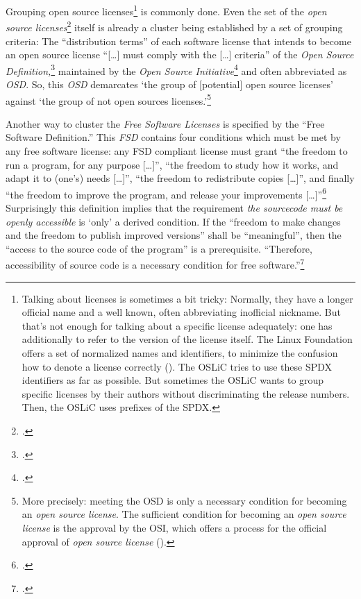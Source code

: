 Grouping open source licenses\footnote{Talking about licenses is sometimes a bit
tricky: Normally, they have a longer official name and a well known, often
abbreviating inofficial nickname. But that's not enough for talking about a
specific license adequately: one has additionally to refer to the version of the
license itself. The Linux Foundation offers a set of normalized names and
identifiers, to minimize the confusion how to denote a license correctly
(\cite[cf.][\nopage wp]{LinuxFounSpdxList2014a}). The OSLiC tries to use these
SPDX identifiers as far as possible. But sometimes the OSLiC wants to group
specific licenses by their authors without discriminating the release numbers.
Then, the OSLiC uses prefixes of the SPDX.} is commonly done.
Even the set of the \emph{open source li\-cen\-ses}\footcite[cf.][\nopage
wp]{OSI2012b} itself is already a cluster being established by a set of grouping
criteria: The \enquote{distribution terms} of each software license that intends
to become an open source license \enquote{[\ldots] must comply with the [\ldots]
criteria} of the \emph{Open Source De\-fi\-ni\-tion,}\footcite[cf.][\nopage
wp]{OSI2012a} maintained by the \emph{Open Source
Initiative}\footcite[cf.][\nopage wp]{OSI2012c} and often abbreviated as
\emph{OSD}. So, this \emph{OSD} demarcates `the group of [potential] open source
licenses' against `the group of not open sources licenses.'\footnote{More
precisely: meeting the OSD is only a necessary condition for becoming an
\emph{open source license}. The sufficient condition for becoming an \emph{open
source license} is the approval by the OSI, which offers a process for the
official approval of \emph{open source license} (\cite[cf.][\nopage
wp]{OSI2012d}).}

Another way to cluster the \emph{Free Software Licenses} is specified by the
\enquote{Free Software Definition.} This \emph{FSD} contains four conditions
which must be met by any free software license: any FSD compliant license must
grant \enquote{the freedom to run a program, for any purpose [\ldots]},
\enquote{the freedom to study how it works, and adapt it to (one's) needs
[\ldots]}, \enquote{the freedom to redistribute copies [\ldots]}, and finally
\enquote{the freedom to improve the program, and release your improvements
[\ldots]}\footcite[cf.][41]{Stallman1996a} Surprisingly this definition
implies that the requirement \emph{the sourcecode must be openly accessible}
is `only' a derived condition. If the \enquote{freedom to make changes and the
freedom to publish improved versions} shall be \enquote{meaningful}, then the
\enquote{access to the source code of the program} is a prerequisite.
\enquote{Therefore, accessibility of source code is a necessary condition for
free software.}\footcite[cf.][41]{Stallman1996a}

